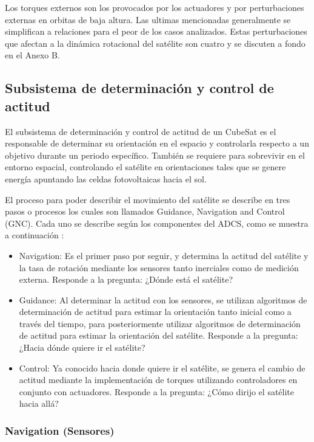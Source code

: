 Los torques externos son los provocados por los actuadores y por perturbaciones externas en orbitas de baja altura. Las ultimas mencionadas generalmente se simplifican a relaciones para el peor de los casos analizados. Estas perturbaciones que afectan a la dinámica rotacional del satélite son cuatro y se discuten a fondo en el Anexo B.

\subsection{Subsistema de determinación y control de actitud}

El subsistema de determinación y control de actitud de un CubeSat es el responsable de determinar su orientación en el espacio y controlarla respecto a un objetivo durante un periodo específico. También se requiere para sobrevivir en el entorno espacial, controlando el satélite en orientaciones tales que se genere energía apuntando las celdas fotovoltaicas hacia el sol.

El proceso para poder describir el movimiento del satélite se describe en tres pasos o procesos los cuales son llamados Guidance, Navigation and Control (GNC). Cada uno se describe según los componentes del ADCS, como se muestra a continuación \cite{ref28}:

\begin{itemize}
	\item Navigation: Es el primer paso por seguir, y determina la actitud del satélite y la tasa de rotación mediante los sensores tanto inerciales como de medición externa. Responde a la pregunta: ¿Dónde está el satélite?
	\item Guidance: Al determinar la actitud con los sensores, se utilizan algoritmos de determinación de actitud para estimar la orientación tanto inicial como a través del tiempo, para posteriormente utilizar algoritmos de determinación de actitud para estimar la orientación del satélite. Responde a la pregunta: ¿Hacia dónde quiere ir el satélite?
	\item Control: Ya conocido hacia donde quiere ir el satélite, se genera el cambio de actitud mediante la implementación de torques utilizando controladores en conjunto con actuadores. Responde a la pregunta: ¿Cómo dirijo el satélite hacia allá?
\end{itemize}

\subsubsection{Navigation (Sensores) \cite{ref6}}

